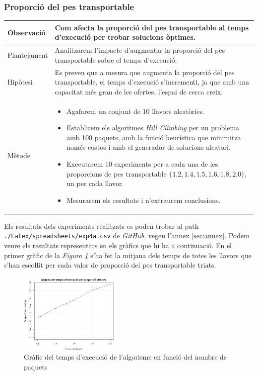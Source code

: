 \documentclass[a4paper]{article}
\begin{document}
	\subsubsection{Proporció del pes transportable}
	\begin{table}[ht]
		\centering
		\begin{tabular}{|l|p{10cm}|}
			\hline
			Observació & Com afecta la proporció del pes transportable al temps d'execució per trobar solucions òptimes.\\
			\hline
			Plantejament & Analitzarem l'impacte d'augmentar la proporció del pes transportable sobre el temps d'execució. \\
			\hline
			Hipòtesi & Es preveu que a mesura que augmenta la proporció del pes transportable, el temps d'execució s'incrementi, ja que amb una capacitat més gran de les ofertes, l'espai de cerca creix.\\
			\hline
			Mètode &
			\begin{itemize}
				\item Agafarem un conjunt de $10$ llavors aleatòries.
				\item Establirem els algoritmes \textit{Hill Climbing} per un problema amb 100 paquets, amb la funció heurística que minimitza només costos i amb el generador de solucions aleatori.
				\item Executarem $10$ experiments per a cada una de les proporcions de pes transportable $\{1.2, 1.4, 1.5, 1.6, 1.8, 2.0 \}$, un per cada llavor.
				\item Mesurarem els resultats i n'extraurem conclusions.
			\end{itemize} \\
			\hline
		\end{tabular}
		\label{tab:exp4a_apartats}
	\end{table}

	Els resultats dels experiments realitzats es poden trobar al path \texttt{./Latex/spreadsheets/exp4a.csv} de \textit{GitHub}, vegeu l'annex \ref{sec:annex}. Podem veure els resultats representats en els gràfics que hi ha a continuació. En el primer gràfic de la \textit{Figura \ref{fig:exp4a_grafic_lineal}} s'ha fet la mitjana dels temps de totes les llavors que s'han escollit per cada valor de proporció del pes transportable triats.
	
	\begin{figure}[H]
		\centering
		\includegraphics[width=0.45\textwidth]{images/exp4a_grafic_lineal.png}
		\caption{Gràfic del temps d'execució de l'algorisme en funció del nombre de paquets}
		\label{fig:exp4a_grafic_lineal}
	\end{figure}
	
\end{document}
